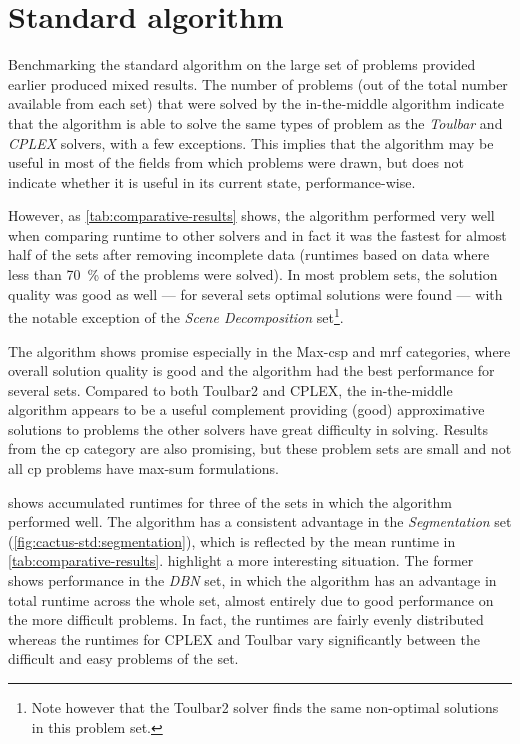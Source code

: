 \section{Standard algorithm}
Benchmarking the standard algorithm on the large set of problems provided earlier produced mixed results.
The number of problems (out of the total number available from each set) that were solved by the in-the-middle algorithm indicate that the algorithm is able to solve the same types of problem as the \emph{Toulbar} and \emph{CPLEX} solvers, with a few exceptions.
This implies that the algorithm may be useful in most of the fields from which problems were drawn, but does not indicate whether it is useful in its current state, performance-wise.

However, as \cref{tab:comparative-results} shows, the algorithm performed very well when comparing runtime to other solvers and in fact it was the fastest for almost half of the sets after removing incomplete data (runtimes based on data where less than \SI{70}{\percent} of the problems were solved).
In most problem sets, the solution quality was good as well --- for several sets optimal solutions were found --- with the notable exception of the \emph{Scene Decomposition} set\footnote{Note however that the Toulbar2 solver finds the same non-optimal solutions in this problem set.}.

The algorithm shows promise especially in the Max-\gls{csp} and \gls{mrf} categories, where overall solution quality is good and the algorithm had the best performance for several sets.
Compared to both Toulbar2 and CPLEX, the in-the-middle algorithm appears to be a useful complement providing (good) approximative solutions to problems the other solvers have great difficulty in solving.
Results from the \gls{cp} category are also promising, but these problem sets are small and not all \gls{cp} problems have max-sum formulations.

 shows accumulated runtimes for three of the sets in which the algorithm performed well.
The algorithm has a consistent advantage in the \emph{Segmentation} set (\cref{fig:cactus-std:segmentation}), which is reflected by the mean runtime in \cref{tab:comparative-results}.
 highlight a more interesting situation.
The former shows performance in the \emph{DBN} set, in which the algorithm has an advantage in total runtime across the whole set, almost entirely due to good performance on the more difficult problems.
In fact, the runtimes are fairly evenly distributed whereas the runtimes for CPLEX and Toulbar vary significantly between the difficult and easy problems of the set.

